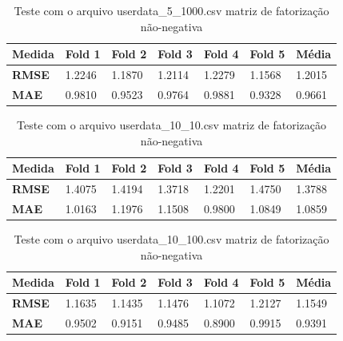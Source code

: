 \documentclass[
	12pt,				%
	oneside,			%
	a4paper,			%
	chapter=TITLE,		%
	english,			%
	french,				%
	spanish,			%
	brazil				%
	]{abntex2}
\begin{document}
\begin{table}[ht]
    \centering
    \ABNTEXchapterfont
    \caption{Teste com o arquivo userdata\_5\_1000.csv matriz de fatorização não-negativa}
    \begin{tabular}{|m{1.5cm}|m{1.5cm}|m{1.5cm}|m{1.5cm}|m{1.5cm}|m{1.5cm}|m{1.5cm}|}
    \hline
        \textbf{Medida}& \textbf{Fold 1} & \textbf{Fold 2} & \textbf{Fold 3} & \textbf{Fold 4}& \textbf{Fold 5} & \textbf{Média}\\
        \hline
        \hline
        \textbf{RMSE} & 1.2246 & 1.1870 & 1.2114 & 1.2279 & 1.1568 & 1.2015 \\ 
        \hline
        \textbf{MAE} & 0.9810 & 0.9523 & 0.9764 & 0.9881 & 0.9328 & 0.9661\\
        \hline
    \end{tabular}
    \label{tab:teste9}
\end{table}

\begin{table}[ht]
    \centering
    \ABNTEXchapterfont
    \caption{Teste com o arquivo userdata\_10\_10.csv matriz de fatorização não-negativa}
    \begin{tabular}{|m{1.5cm}|m{1.5cm}|m{1.5cm}|m{1.5cm}|m{1.5cm}|m{1.5cm}|m{1.5cm}|}
    \hline
        \textbf{Medida}& \textbf{Fold 1} & \textbf{Fold 2} & \textbf{Fold 3} & \textbf{Fold 4}& \textbf{Fold 5} & \textbf{Média}\\
        \hline
        \hline
        \textbf{RMSE} & 1.4075 & 1.4194 & 1.3718 & 1.2201 & 1.4750 & 1.3788 \\ 
        \hline
        \textbf{MAE} & 1.0163 & 1.1976 & 1.1508 & 0.9800 & 1.0849 & 1.0859 \\
        \hline
    \end{tabular}
    \label{tab:teste10}
\end{table}

\begin{table}[ht]
    \centering
    \ABNTEXchapterfont
    \caption{Teste com o arquivo userdata\_10\_100.csv matriz de fatorização não-negativa}
    \begin{tabular}{|m{1.5cm}|m{1.5cm}|m{1.5cm}|m{1.5cm}|m{1.5cm}|m{1.5cm}|m{1.5cm}|}
    \hline
        \textbf{Medida}& \textbf{Fold 1} & \textbf{Fold 2} & \textbf{Fold 3} & \textbf{Fold 4}& \textbf{Fold 5} & \textbf{Média}\\
        \hline
        \hline
        \textbf{RMSE} & 1.1635 & 1.1435 & 1.1476 & 1.1072 & 1.2127 & 1.1549 \\ 
        \hline
        \textbf{MAE} & 0.9502 & 0.9151 & 0.9485 & 0.8900 & 0.9915 & 0.9391\\
        \hline
    \end{tabular}
    \label{tab:teste11}
\end{table}
\end{document}
